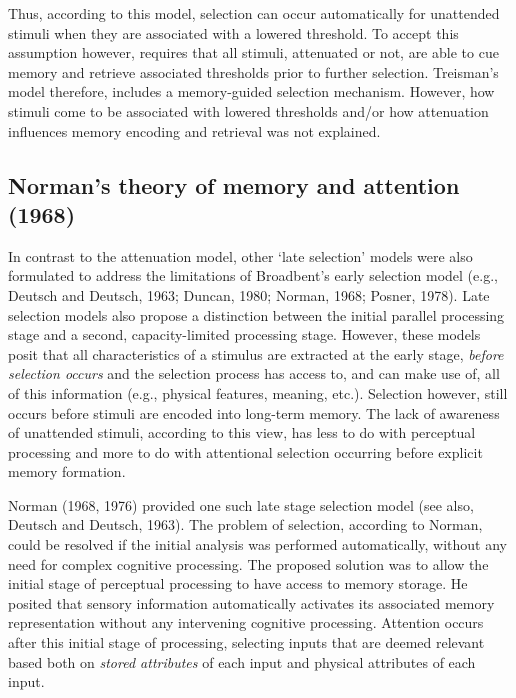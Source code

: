 \documentclass[]{DissertateCUNY}
\begin{document}
Thus, according to this model, selection can occur automatically for
unattended stimuli when they are associated with a lowered threshold. To
accept this assumption however, requires that all stimuli, attenuated or
not, are able to cue memory and retrieve associated thresholds prior to
further selection. Treisman's model therefore, includes a memory-guided
selection mechanism. However, how stimuli come to be associated with
lowered thresholds and/or how attenuation influences memory encoding and
retrieval was not explained.

\hypertarget{normans-theory-of-memory-and-attention-1968}{%
\subsection{Norman's theory of memory and attention
(1968)}\label{normans-theory-of-memory-and-attention-1968}}

In contrast to the attenuation model, other `late selection' models were
also formulated to address the limitations of Broadbent's early
selection model (e.g., Deutsch and Deutsch, 1963; Duncan, 1980; Norman,
1968; Posner, 1978). Late selection models also propose a distinction
between the initial parallel processing stage and a second,
capacity-limited processing stage. However, these models posit that all
characteristics of a stimulus are extracted at the early stage,
\textit{before selection occurs} and the selection process has access
to, and can make use of, all of this information (e.g., physical
features, meaning, etc.). Selection however, still occurs before stimuli
are encoded into long-term memory. The lack of awareness of unattended
stimuli, according to this view, has less to do with perceptual
processing and more to do with attentional selection occurring before
explicit memory formation.

Norman (1968, 1976) provided one such late stage selection model (see
also, Deutsch and Deutsch, 1963). The problem of selection, according to
Norman, could be resolved if the initial analysis was performed
automatically, without any need for complex cognitive processing. The
proposed solution was to allow the initial stage of perceptual
processing to have access to memory storage. He posited that sensory
information automatically activates its associated memory representation
without any intervening cognitive processing. Attention occurs after
this initial stage of processing, selecting inputs that are deemed
relevant based both on \textit{stored attributes} of each input and
physical attributes of each input.
\end{document}
